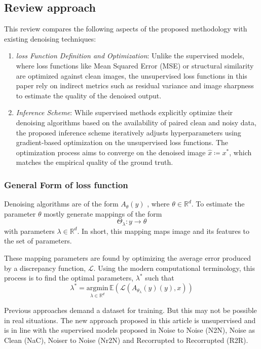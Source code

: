 \documentclass[
]{agujournal2019}
\begin{document}
\subsection{Review approach}\label{review-approach}

This review compares the following aspects of the proposed methodology
with existing denoising techniques:

\begin{enumerate}
\def\labelenumi{\arabic{enumi}.}
\item
  \emph{loss Function Definition and Optimization}: Unlike the
  supervised models, where loss functions like Mean Squared Error (MSE)
  or structural similarity are optimized against clean images, the
  unsupervised loss functions in this paper rely on indirect metrics
  such as residual variance and image sharpness to estimate the quality
  of the denoised output.
\item
  \emph{Inference Scheme}: While supervised methods explicitly optimize
  their denoising algorithms based on the availability of paired clean
  and noisy data, the proposed inference scheme iteratively adjusts
  hyperparameters using gradient-based optimization on the unsupervised
  loss functions. The optimization process aims to converge on the
  denoised image \(\hat{x} \coloneqq x^*\), which matches the empirical
  quality of the ground truth.
\end{enumerate}

\subsubsection{General Form of loss
function}\label{general-form-of-loss-function}

Denoising algorithms are of the form \(A_\theta (y)\) , where
\(\theta\in \mathbb{R}^d\). To estimate the parameter \(\theta\) mostly
generate mappings of the form \[\Theta_\lambda:y\longrightarrow \theta\]
with parameters \(\lambda\in \mathbb{R}^d\). In short, this mapping maps
image and its features to the set of parameters.

These mapping parameters are found by optimizing the average error
produced by a discrepancy function, \(\mathcal{L}\). Using the modern
computational terminology, this process is to find the optimal
parameters, \(\lambda^*\) such that
\[\lambda^*=\underset{\lambda\in \mathbb{R}^d}{\mathrm{argmin}}\,  \mathbb{E}\left(\mathcal{L}(A_{\theta_\lambda}(y)(y),x)\right)\]

Previous approaches demand a dataset for training. But this may not be
possible in real situations. The new approach proposed in this article
is unsupervised and is in line with the supervised models proposed in
Noise to Noise (N2N), Noise as Clean (NaC), Noiser to Noise (Nr2N) and
Recorrupted to Recorrupted (R2R).
\end{document}
